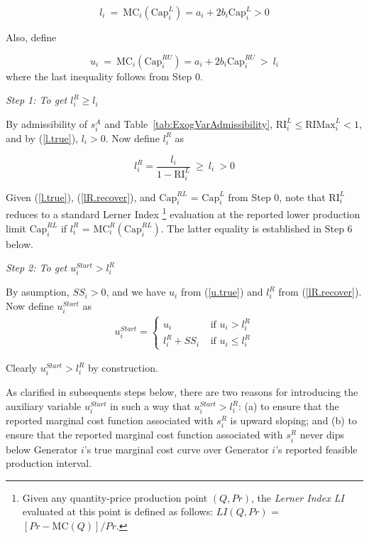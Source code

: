\documentclass[12pt]{article}
\begin{document}
\begin{equation} \label{l.true}
	l_i~ = ~ \mbox{MC}_i(\mbox{Cap}_i^{L}) = a_i + 2 b_i \mbox{Cap}_i^{L} > 0
\end{equation}

\noindent
Also, define

\begin{equation} \label{u.true}
	u_i~ = ~ \mbox{MC}_i(\mbox{Cap}_i^{RU}) = a_i + 2 b_i \mbox{Cap}_i^{RU}~ > ~ l_i
\end{equation}
where the last inequality follows from Step 0.

\bigskip
\noindent\textit{Step 1: To get $l_i^R \ge l_i$}
\bigskip

By admissibility of $s^A_i$ and Table~\ref{tab:ExogVarAdmissibility},
$\mbox{RI}_i^L \le \mbox{RIMax}^L_i < 1$, and by (\ref{l.true}), $l_i > 0$.  Now define $l_i^R$ as

\begin{equation} \label{lR.recover}
	l_i^R = \frac{l_i}{1- \mbox{RI}_i^L} ~ \ge ~ l_i ~ > 0
\end{equation}

\medskip
\noindent
Given (\ref{l.true}), (\ref{lR.recover}), and $\mbox{Cap}^{RL}_i$ = $\mbox{Cap}^{L}_i$ from Step 0, note 
that $\mbox{RI}_i^L$ reduces to a standard Lerner Index%
   \footnote{Given any quantity-price production point $(Q,Pr)$, the \textit{Lerner Index LI\/} evaluated at this point 
   is defined as follows:  $LI(Q,Pr)$ = $[Pr - \mbox{MC}(Q)]/Pr$.}
evaluation at the reported lower production limit $\mbox{Cap}^{RL}_i$ if $l_i^R$ = 
$\mbox{MC}^R_i(\mbox{Cap}^{RL}_i)$.  The latter equality is established in Step 6 below.  

\bigskip
\noindent\textit{Step 2: To get $u_i^{Start} > l_i^R$}
\bigskip

By asumption, $SS_i > 0$, and we have $u_i$ from (\ref{u.true}) and $l_i^R$ from (\ref{lR.recover}).  Now define $u_i^{Start}$ as 
                 \begin{eqnarray} \label{u.start}
    u_i^{Start} = \left \{ \begin{array}{ll}
						 u_i   & \mbox{ if } u_i > l_i^R  \\
						 l_i^R + SS_i & \mbox{ if } u_i \le l_i^R  \end{array} \right. 
                   \end{eqnarray}

\smallskip
\noindent
Clearly $u_i^{Start} > l_i^R$ by construction. 

As clarified in subsequents steps below, there are two reasons for introducing the auxiliary variable $u_i^{Start}$ in such a way that $u_i^{Start} > l_i^R$: (a) to ensure that the reported marginal cost function associated with $s^R_i$ is upward sloping; and (b) to ensure that the reported marginal cost function associated with $s^R_i$ never dips below Generator $i$'s true marginal cost curve over Generator $i$'s reported feasible production interval. 
\end{document}
